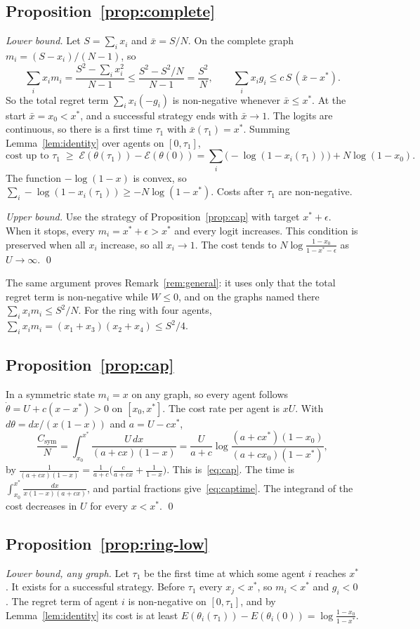 \documentclass[11pt,a4paper]{article}
\theoremstyle{definition}
\theoremstyle{plain}
\newcommand{\xs}{x^{*}}
\newcommand{\En}{\mathcal{E}}
\begin{document}
\subsection{Proposition~\ref{prop:complete}}
\emph{Lower bound.} Let $S=\sum_ix_i$ and $\bar x=S/N$. On the complete graph $m_i=(S-x_i)/(N-1)$, so
\[
\sum_ix_im_i=\frac{S^2-\sum_ix_i^2}{N-1}\le\frac{S^2-S^2/N}{N-1}=\frac{S^2}{N},
\qquad
\sum_ix_ig_i\le c\,S\,(\bar x-\xs).
\]
So the total regret term $\sum_ix_i(-g_i)$ is non-negative whenever $\bar x\le\xs$. At the start $\bar x=x_0<\xs$, and a successful strategy ends with $\bar x\to1$. The logits are continuous, so there is a first time $\tau_1$ with $\bar x(\tau_1)=\xs$. Summing Lemma~\ref{lem:identity} over agents on $[0,\tau_1]$,
\[
\text{cost up to }\tau_1\;\ge\;\En(\theta(\tau_1))-\En(\theta(0))=\sum_i\bigl(-\log(1-x_i(\tau_1))\bigr)+N\log(1-x_0).
\]
The function $-\log(1-x)$ is convex, so $\sum_i-\log(1-x_i(\tau_1))\ge-N\log(1-\xs)$. Costs after $\tau_1$ are non-negative.

\emph{Upper bound.} Use the strategy of Proposition~\ref{prop:cap} with target $\xs+\epsilon$. When it stops, every $m_i=\xs+\epsilon>\xs$ and every logit increases. This condition is preserved when all $x_i$ increase, so all $x_i\to1$. The cost tends to $N\log\frac{1-x_0}{1-\xs-\epsilon}$ as $U\to\infty$. \qed

The same argument proves Remark~\ref{rem:general}: it uses only that the total regret term is non-negative while $W\le0$, and on the graphs named there $\sum_ix_im_i\le S^2/N$. For the ring with four agents, $\sum_ix_im_i=(x_1+x_3)(x_2+x_4)\le S^2/4$.

\subsection{Proposition~\ref{prop:cap}}
In a symmetric state $m_i=x$ on any graph, so every agent follows $\dot\theta=U+c(x-\xs)>0$ on $[x_0,\xs]$. The cost rate per agent is $xU$. With $d\theta=dx/(x(1-x))$ and $a=U-c\xs$,
\[
\frac{C_{\mathrm{sym}}}{N}=\int_{x_0}^{\xs}\frac{U\,dx}{(a+cx)(1-x)}=\frac{U}{a+c}\log\frac{(a+c\xs)(1-x_0)}{(a+cx_0)(1-\xs)},
\]
by $\frac{1}{(a+cx)(1-x)}=\frac{1}{a+c}\bigl(\frac{c}{a+cx}+\frac{1}{1-x}\bigr)$. This is~\eqref{eq:cap}. The time is $\int_{x_0}^{\xs}\frac{dx}{x(1-x)(a+cx)}$, and partial fractions give~\eqref{eq:captime}. The integrand of the cost decreases in $U$ for every $x<\xs$. \qed

\subsection{Proposition~\ref{prop:ring-low}}
\emph{Lower bound, any graph.} Let $\tau_1$ be the first time at which some agent $i$ reaches $\xs$. It exists for a successful strategy. Before $\tau_1$ every $x_j<\xs$, so $m_i<\xs$ and $g_i<0$. The regret term of agent $i$ is non-negative on $[0,\tau_1]$, and by Lemma~\ref{lem:identity} its cost is at least $E(\theta_i(\tau_1))-E(\theta_i(0))=\log\frac{1-x_0}{1-\xs}$.
\end{document}
